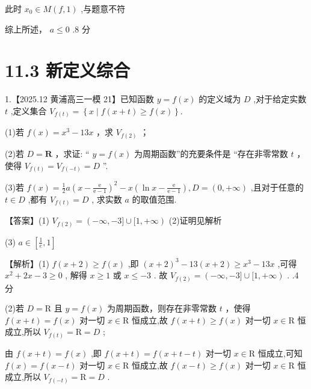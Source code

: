 \documentclass[10pt]{article}
\begin{document}
此时 \({x}_{0} \in  M\left( {f,1}\right)\) ,与题意不符

综上所述， \(a \leq  0\) .8 分

\section*{11.3 新定义综合}

1.【2025.12 黄浦高三一模 21】已知函数 \(y = f\left( x\right)\) 的定义域为 \(D\) ,对于给定实数 \(t\) ,定义集合 \({V}_{f\left( t\right) } = \left\{  {x \mid  f\left( {x + t}\right)  \geq  f\left( x\right) }\right\}  .\)

(1)若 \(f\left( x\right)  = {x}^{3} - {13x}\) ，求 \({V}_{f\left( 2\right) }\) ；

(2)若 \(D = \mathbf{R}\) ，求证: “ \(y = f\left( x\right)\) 为周期函数”的充要条件是 “存在非零常数 \(t\) ，使得 \({V}_{f\left( t\right) } = {V}_{f\left( {-t}\right) } = D\) ”.

(3)若 \(f\left( x\right)  = \frac{1}{2}a{\left( x - \frac{\mathrm{e}}{\mathrm{e} - 1}\right) }^{2} - x\left( {\ln x - \frac{\mathrm{e}}{\mathrm{e} - 1}}\right) ,D = \left( {0, + \infty }\right)\) ,且对于任意的 \(t \in  D\) ,都有 \({V}_{f\left( t\right) } = D\) , 求实数 \(a\) 的取值范围.

【答案】(1) \({V}_{f\left( 2\right) } = \left( {-\infty , - 3\rbrack \cup \lbrack 1, + \infty }\right)\) (2)证明见解析

(3) \(a \in  \left\lbrack  {\frac{1}{e},1}\right\rbrack\)

【解析】(1) \(f\left( {x + 2}\right)  \geq  f\left( x\right)\) ,即 \({\left( x + 2\right) }^{3} - {13}\left( {x + 2}\right)  \geq  {x}^{3} - {13x}\) ,可得 \({x}^{2} + {2x} - 3 \geq  0\) , 解得 \(x \geq  1\) 或 \(x \leq   - 3\) . 故 \({V}_{f\left( 2\right) } = \left( {-\infty , - 3\rbrack \cup \lbrack 1, + \infty }\right)\) . .4 分

(2)若 \(D = \mathrm{R}\) 且 \(y = f\left( x\right)\) 为周期函数，则存在非零常数 \(t\) ，使得 \(f\left( {x + t}\right)  = f\left( x\right)\) 对一切 \(x \in  \mathrm{R}\) 恒成立,故 \(f\left( {x + t}\right)  \geq  f\left( x\right)\) 对一切 \(x \in  \mathrm{R}\) 恒成立,所以 \({V}_{f\left( t\right) } = \mathrm{R} = D\) ;

由 \(f\left( {x + t}\right)  = f\left( x\right)\) ,即 \(f\left( {x + t}\right)  = f\left( {x + t - t}\right)\) 对一切 \(x \in  \mathrm{R}\) 恒成立,可知 \(f\left( x\right)  = f\left( {x - t}\right)\) 对一切 \(x \in  \mathrm{R}\) 恒成立,故 \(f\left( {x - t}\right)  \geq  f\left( x\right)\) 对一切 \(x \in  \mathrm{R}\) 恒成立,所以 \({V}_{f\left( {-t}\right) } = \mathrm{R} = D\) .
\end{document}
